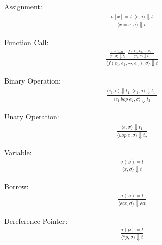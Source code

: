\documentclass[12pt]{article}
\begin{document}
	Assignment:
	\begin{align*}
		\frac{ \sigma[x] = t \ \ 
			\langle e, \sigma \rangle\Downarrow t}
		{\langle x = e, \sigma \rangle\Downarrow \sigma}
	\end{align*}

	Function Call: 
	\begin{align*}
		\frac{
			\frac{i = 1..n}
			{\langle e_i, \sigma \rangle\Downarrow t_i} \ \ 
			\frac{f(x_1, x_2, \cdots, x_n)}
			{\langle x_i, \sigma \rangle\Downarrow t_i}
		}
		{
			\langle f(e_1, e_2, \cdots, e_n), \sigma \rangle\Downarrow t
		}
	\end{align*}
	


	Binary Operation:
	\begin{align*}
		\frac{
			\langle e_1, \sigma \rangle\Downarrow t_1 \ \
			\langle e_2, \sigma \rangle\Downarrow t_1 \ \
		}
		{\langle e_1\ bop\ e_2, \sigma \rangle\Downarrow t_2}
	\end{align*}
	
	Unary Operation:
	\begin{align*}
		\frac{
			\langle e, \sigma \rangle\Downarrow t_1
		}
		{\langle uop\ e, \sigma \rangle\Downarrow t_2}
	\end{align*}

	Variable: 
	\begin{align*}
		\frac{
			\sigma(x) = t
		}
		{\langle x, \sigma \rangle\Downarrow t}
	\end{align*}
	
	Borrow:
	\begin{align*}
		\frac{
			\sigma(x) = t
		}
		{\langle \&x, \sigma \rangle\Downarrow \&t}
	\end{align*}
	
	Dereference Pointer:
	\begin{align*}
		\frac{
			\sigma(p) = t
		}
		{\langle *p, \sigma \rangle\Downarrow t}
	\end{align*}
\end{document}
